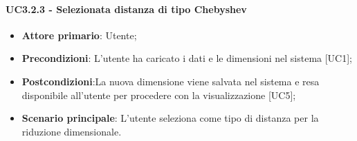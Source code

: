 \paragraph{UC3.2.3 - Selezionata distanza di tipo Chebyshev}
\begin{itemize}
	\item \textbf{Attore primario}: Utente;
	\item \textbf{Precondizioni}: L'utente ha caricato i dati e le dimensioni nel sistema [UC1];
	\item \textbf{Postcondizioni}:La nuova dimensione viene salvata nel sistema e resa disponibile all'utente per procedere con la visualizzazione [UC5];
	\item \textbf{Scenario principale}: L'utente seleziona  come tipo di distanza per la riduzione dimensionale.
\end{itemize}